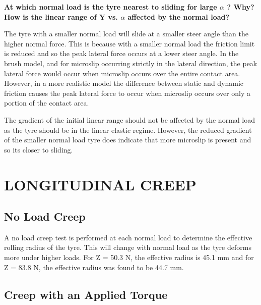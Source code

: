 \documentclass{article}
\begin{document}
\begin{center}
    \textbf{At which normal load is the tyre nearest to sliding for large
    $ \alpha $ ? Why? How is the
    linear range of Y vs.
    $ \alpha $ affected by the normal load?}
\end{center}

The tyre with a smaller normal load will slide at a smaller steer angle than the higher normal force.
This is because with a smaller normal load the friction limit is reduced and so the peak lateral force occurs at a lower steer angle.
In the brush model, and for microslip occurring strictly in the lateral direction, the peak lateral force would occur when microslip occurs over the entire contact area.
However, in a more realistic model the difference between static and dynamic friction causes the peak lateral force to occur when microslip occurs over only a portion of the contact area.

The gradient of the initial linear range should not be affected by the normal load as the tyre should be in the linear elastic regime.
However, the reduced gradient of the smaller normal load tyre does indicate that more microslip is present and so its closer to sliding.

\section{LONGITUDINAL CREEP}

\subsection{\textbf{No Load Creep} \label{no_load_creep}}

A no load creep test is performed at each normal load to determine the effective rolling radius of the tyre.
This will change with normal load as the tyre deforms more under higher loads.
For Z = 50.3 N, the effective radius is 45.1 mm and for Z = 83.8 N, the effective radius was found to be 44.7 mm.

\subsection{\textbf{Creep with an Applied Torque}}
\end{document}
